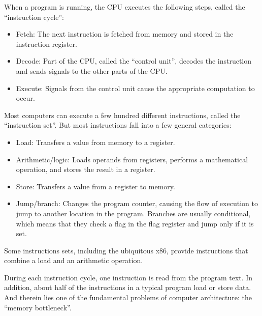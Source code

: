 \documentclass[12pt]{book}
\begin{document}
{\begin{itemize}
\end{itemize}

When a program is running, the CPU executes the following steps,
called the ``instruction cycle'':

\begin{itemize}

\item Fetch: The next instruction is fetched from memory and stored
in the instruction register.

\item Decode: Part of the CPU, called the ``control unit'', decodes
the instruction and sends signals to the other parts of
the CPU.

\item Execute: Signals from the control unit cause the appropriate
  computation to occur.

\end{itemize}

Most computers can execute a few hundred different instructions,
called the ``instruction set''.  But most instructions fall
into a few general categories:

\begin{itemize}

\item Load: Transfers a value from memory to a register.

\item Arithmetic/logic: Loads operands from registers, performs
a mathematical operation, and stores the result in a register.

\item Store: Transfers a value from a register to memory.

\item Jump/branch: Changes the program counter, causing the flow
of execution to jump to another location in the program.  Branches
are usually conditional, which means that they check a flag
in the flag register and jump only if it is set.

\end{itemize}

Some instructions sets, including the ubiquitous x86, provide
instructions that combine a load and an arithmetic operation.

During each instruction cycle, one instruction is read from the
program text.  In addition, about half of the instructions in a
typical program load or store data.  And therein
lies one of the fundamental problems of computer architecture: the
``memory bottleneck''.

}
\end{document}
